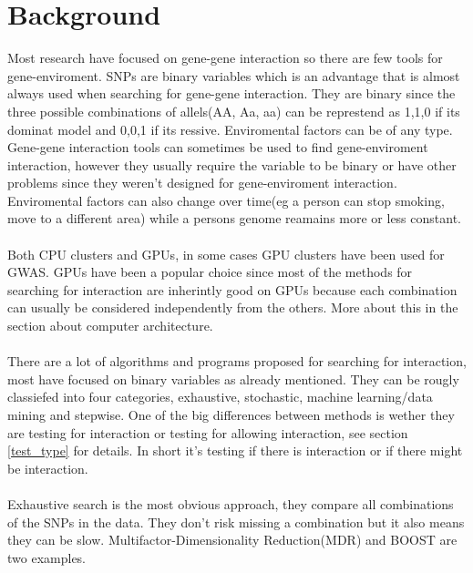 \documentclass[10pt,a4paper]{article}
\begin{document}
\clearpage
\section{Background}
Most research have focused on gene-gene interaction so there are few tools for gene-enviroment. SNPs are binary variables which is an advantage that is almost always used when searching for gene-gene interaction. They are binary since the three possible combinations of allels(AA, Aa, aa)  can be represtend as 1,1,0 if its dominat model and 0,0,1 if its ressive\cite{}. Enviromental factors can be of any type\cite{gene_enviroment_2013}. Gene-gene interaction tools can sometimes be used to find gene-enviroment interaction, however they usually require the variable to be binary or have other problems since they weren't designed for gene-enviroment interaction. Enviromental factors can also change over time(eg a person can stop smoking, move to a different area) while a persons genome reamains more or less constant.\cite{gene_enviroment_2013}\\
\\
Both CPU clusters\cite{biforce} and GPUs\cite{gwis,gboost,gmdr_gpu,cuda_lr,genie_2012,plink_gpu}, in some cases GPU clusters\cite{} have been used for GWAS. GPUs have been a popular choice since most of the methods for searching for interaction are inherintly good on GPUs because each combination can usually be considered independently from the others. More about this in the section about computer architecture.\\
\\
There are a lot of algorithms and programs proposed for searching for interaction, most have focused on binary variables as already mentioned. They can be rougly classiefed into four categories, exhaustive, stochastic, machine learning/data mining and stepwise\cite{fast_high_order_cluster}. One of the big differences between methods is wether they are testing for interaction or testing for allowing interaction, see section \ref{test_type} for details. In short it's testing if there is interaction or if there might be interaction.\\
\\
Exhaustive search is the most obvious approach, they compare all combinations of the SNPs in the data. They don't risk missing a combination but it also means they can be slow. Multifactor-Dimensionality Reduction(MDR)\cite{mdr_2001} and BOOST\cite{boost_gene_gene} are two examples.\\
\end{document}
